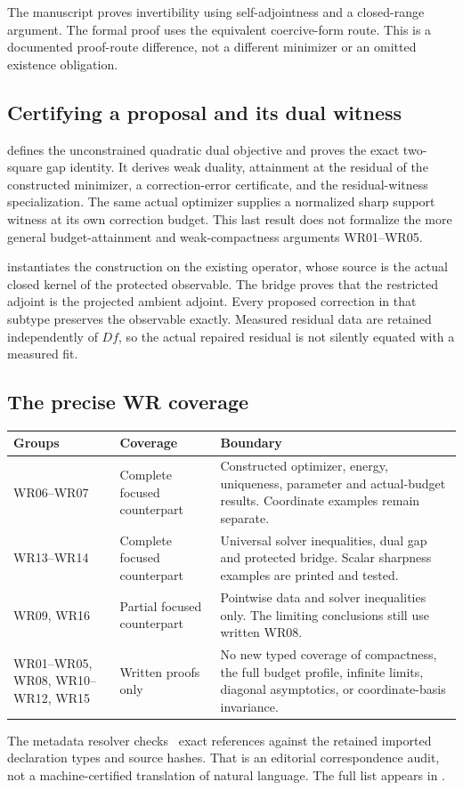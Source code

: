 \documentclass[11pt]{article}
\begin{document}
The manuscript proves invertibility using self-adjointness and a closed-range argument. The formal proof uses the equivalent coercive-form route. This is a documented proof-route difference, not a different minimizer or an omitted existence obligation.

\subsection{Certifying a proposal and its dual witness}
 defines the unconstrained quadratic dual objective and proves the exact two-square gap identity. It derives weak duality, attainment at the residual of the constructed minimizer, a correction-error certificate, and the residual-witness specialization. The same actual optimizer supplies a normalized sharp support witness at its own correction budget. This last result does not formalize the more general budget-attainment and weak-compactness arguments WR01--WR05.

 instantiates the construction on the existing  operator, whose source is the actual closed kernel of the protected observable. The bridge proves that the restricted adjoint is the projected ambient adjoint. Every proposed correction in that subtype preserves the observable exactly. Measured residual data are retained independently of $Df$, so the actual repaired residual is not silently equated with a measured fit.

\subsection{The precise WR coverage}
\begin{center}
\begin{tabularx}{\linewidth}{@{}p{.17\linewidth}p{.22\linewidth}X@{}}
\toprule Groups & Coverage & Boundary\\\midrule
WR06--WR07 & Complete focused counterpart & Constructed optimizer, energy, uniqueness, parameter and actual-budget results. Coordinate examples remain separate.\\[4pt]
WR13--WR14 & Complete focused counterpart & Universal solver inequalities, dual gap and protected bridge. Scalar sharpness examples are printed and tested.\\[4pt]
WR09, WR16 & Partial focused counterpart & Pointwise data and solver inequalities only. The limiting conclusions still use written WR08.\\[4pt]
WR01--WR05, WR08, WR10--WR12, WR15 & Written proofs only & No new typed coverage of compactness, the full budget profile, infinite limits, diagonal asymptotics, or coordinate-basis invariance.\\\bottomrule
\end{tabularx}
\end{center}
The metadata resolver checks \EditionFocusedReferences\ exact references against the retained imported declaration types and source hashes. That is an editorial correspondence audit, not a machine-certified translation of natural language. The full list appears in .
\end{document}
